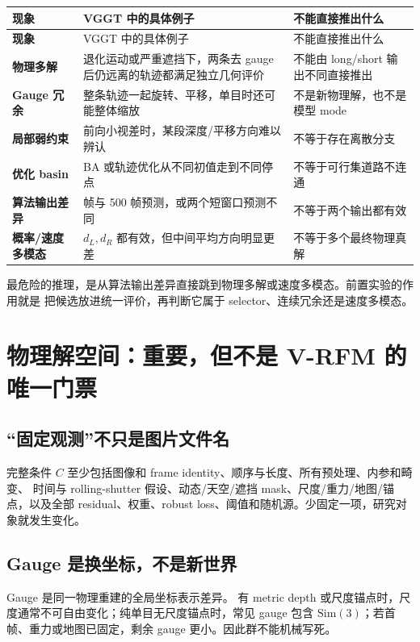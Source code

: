 \documentclass[UTF8,a4paper,11pt]{ctexart}
\newcommand{\Sim}{\mathrm{Sim}}
\begin{document}
\begin{longtable}{>{\raggedright\arraybackslash\bfseries}p{2.5cm}
  >{\raggedright\arraybackslash}p{5.1cm}
  >{\raggedright\arraybackslash}p{6.7cm}}
  \toprule
  现象 & VGGT 中的具体例子 & 不能直接推出什么 \\
  \midrule
  \endfirsthead
  \toprule
  现象 & VGGT 中的具体例子 & 不能直接推出什么 \\
  \midrule
  \endhead
  物理多解 & 退化运动或严重遮挡下，两条去 gauge 后仍远离的轨迹都满足独立几何评价
    & 不能由 long/short 输出不同直接推出 \\
  Gauge 冗余 & 整条轨迹一起旋转、平移，单目时还可能整体缩放
    & 不是新物理解，也不是模型 mode \\
  局部弱约束 & 前向小视差时，某段深度/平移方向难以辨认
    & 不等于存在离散分支 \\
  优化 basin & BA 或轨迹优化从不同初值走到不同停点
    & 不等于可行集道路不连通 \\
  算法输出差异 & 100 帧与 500 帧预测，或两个短窗口预测不同
    & 不等于两个输出都有效 \\
  概率/速度多模态 & $d_L,d_R$ 都有效，但中间平均方向明显更差
    & 不等于多个最终物理真解 \\
  \bottomrule
\end{longtable}

最危险的推理，是从算法输出差异直接跳到物理多解或速度多模态。前置实验的作用就是
把候选放进统一评价，再判断它属于 selector、连续冗余还是速度多模态。

\section{物理解空间：重要，但不是 V-RFM 的唯一门票}

\subsection{“固定观测”不只是图片文件名}

完整条件 $C$ 至少包括图像和 frame identity、顺序与长度、所有预处理、内参和畸变、
时间与 rolling-shutter 假设、动态/天空/遮挡 mask、尺度/重力/地图/锚点，以及全部
residual、权重、robust loss、阈值和随机源。少固定一项，研究对象就发生变化。

\subsection{Gauge 是换坐标，不是新世界}

Gauge 是同一物理重建的全局坐标表示差异\citep{hartley2004multiple,triggs2000bundle}。
有 metric depth 或尺度锚点时，尺度通常不可自由变化；纯单目无尺度锚点时，常见 gauge
包含 $\Sim(3)$；若首帧、重力或地图已固定，剩余 gauge 更小。因此群不能机械写死。
\end{document}
